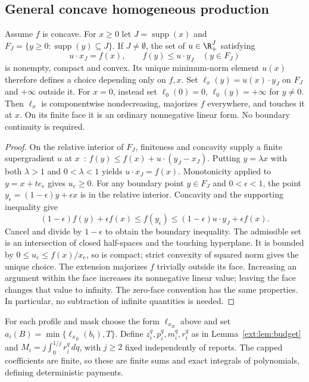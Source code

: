 \subsection{General concave homogeneous production}
\begin{lemma}\label{ext:lem:support}
Assume $f$ is concave.  For $x\ge0$ let $J=\operatorname{supp}(x)$ and
$F_J=\{y\ge0:\operatorname{supp}(y)\subseteq J\}$.
If $J\ne\emptyset$, the set of $u\in\R_+^J$ satisfying
\[
 u\cdot x_J=f(x),\qquad f(y)\le u\cdot y_J\quad(y\in F_J)
\]
is nonempty, compact and convex.  Its unique minimum-norm element $u(x)$
therefore defines a choice depending only on $f,x$.
Set $\ell_x(y)=u(x)\cdot y_J$ on $F_J$ and $+\infty$ outside it.
For $x=0$, instead set $\ell_0(0)=0$, $\ell_0(y)=+\infty$ for $y\ne0$.
Then $\ell_x$ is componentwise nondecreasing, majorizes $f$ everywhere,
and touches it at $x$.  On its finite face it is an ordinary nonnegative
linear form.  No boundary continuity is required.
\end{lemma}
\begin{proof}
On the relative interior of $F_J$, finiteness and concavity supply a finite
supergradient $u$ at $x$~\cite{BoydSubgradients}:
$f(y)\le f(x)+u\cdot(y_J-x_J)$.
Putting $y=\lambda x$ with both $\lambda>1$ and $0<\lambda<1$ yields
$u\cdot x_J=f(x)$.  Monotonicity applied to $y=x+te_e$ gives $u_e\ge0$.
For any boundary point $y\in F_J$ and $0<\epsilon<1$, the point
$y_\epsilon=(1-\epsilon)y+\epsilon x$ is in the relative interior.
Concavity and the supporting inequality give
\[
 (1-\epsilon)f(y)+\epsilon f(x)\le f(y_\epsilon)
 \le(1-\epsilon)u\cdot y_J+\epsilon f(x).
\]
Cancel and divide by $1-\epsilon$ to obtain the boundary inequality.
The admissible set is an intersection of closed half-spaces and the touching
hyperplane.  It is bounded by $0\le u_e\le f(x)/x_e$, so is compact;
strict convexity of squared norm gives the unique choice.
The extension majorizes $f$ trivially outside its face.  Increasing an argument
within the face increases its nonnegative linear value; leaving the face
changes that value to infinity.  The zero-face convention has the same
properties.  In particular, no subtraction of infinite quantities is needed.
\end{proof}

\begin{definition}\label{ext:def:general}
For each profile and mask choose the form $\ell_{x_B}$ above and set
$a_i(B)=\min\{\ell_{x_B}(b_i),T\}$.
Define $z_i^q,p_i^q,m_i^q,r_i^q$ as in Lemma~\ref{ext:lem:budget} and
$M_i=j\int_0^{1/j}r_i^q\,dq$, with $j\ge2$ fixed independently of reports.
The capped coefficients are finite, so these are finite sums and exact
integrals of polynomials, defining deterministic payments.
\end{definition}

